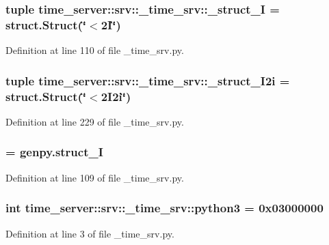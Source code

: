 \subsubsection[{\-\_\-struct\-\_\-2\-I}]{\setlength{\rightskip}{0pt plus 5cm}tuple {\bf time\-\_\-server\-::srv\-::\-\_\-time\-\_\-srv\-::\-\_\-struct\-\_\-I} = struct.\-Struct(\char`\"{}$<$2\-I\char`\"{})}\label{namespacetime__server_1_1srv_1_1__time__srv_af4d408eea38b90b48f672f390e0b07c6}


\-Definition at line 110 of file \-\_\-time\-\_\-srv.\-py.

\subsubsection[{\-\_\-struct\-\_\-2\-I2i}]{\setlength{\rightskip}{0pt plus 5cm}tuple {\bf time\-\_\-server\-::srv\-::\-\_\-time\-\_\-srv\-::\-\_\-struct\-\_\-I2i} = struct.\-Struct(\char`\"{}$<$2\-I2i\char`\"{})}\label{namespacetime__server_1_1srv_1_1__time__srv_a3f2d4466261e5145101322791018124c}


\-Definition at line 229 of file \-\_\-time\-\_\-srv.\-py.

\subsubsection[{\-\_\-struct\-\_\-\-I}]{ = genpy.\-struct\-\_\-\-I}\label{namespacetime__server_1_1srv_1_1__time__srv_aed715dfd02a61c410518db3235f0d9af}


\-Definition at line 109 of file \-\_\-time\-\_\-srv.\-py.

\subsubsection[{python3}]{\setlength{\rightskip}{0pt plus 5cm}int {\bf time\-\_\-server\-::srv\-::\-\_\-time\-\_\-srv\-::python3} = 0x03000000}\label{namespacetime__server_1_1srv_1_1__time__srv_a84328307ca57047e02fb19743d4eba43}


\-Definition at line 3 of file \-\_\-time\-\_\-srv.\-py.

